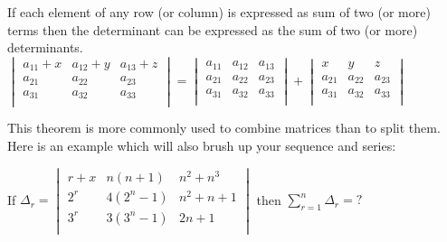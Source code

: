 \begin{theorem}
If each element of any row (or column) is expressed as sum of two (or more) terms then the determinant can be expressed as the sum of two (or more) determinants.\\
$\begin{vmatrix}
    a_{11}+x & a_{12}+y & a_{13}+z \\
    a_{21} & a_{22} & a_{23} \\
    a_{31} & a_{32} & a_{33} \\
\end{vmatrix} = \begin{vmatrix}
    a_{11} & a_{12} & a_{13} \\
    a_{21} & a_{22} & a_{23} \\
    a_{31} & a_{32} & a_{33} \\
\end{vmatrix} + \begin{vmatrix}
    x & y & z \\
    a_{21} & a_{22} & a_{23} \\
    a_{31} & a_{32} & a_{33} \\
\end{vmatrix}$
\end{theorem}
This theorem is more commonly used to combine matrices than to split them. Here is an example which will also brush up your sequence and series:\\
\begin{example}
    If $\Delta_r = \begin{vmatrix}
    r+x & n(n+1) & n^2+n^3 \\
    2^r & 4(2^n-1) & n^2+n+1 \\
    3^r & 3(3^n-1) & 2n+1 \\
\end{vmatrix}$ then $\sum^n_{r=1}\Delta_r=?$
\end{example}
